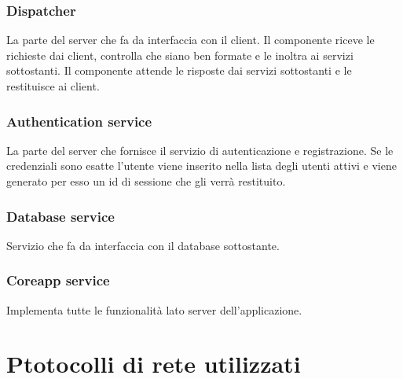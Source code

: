 \documentclass[12pt,a4]{article}
\begin{document}
\subsubsection{Dispatcher}
La parte del server che fa da interfaccia con il client. Il componente riceve le richieste dai client, controlla che siano ben formate e le inoltra ai servizi sottostanti. Il componente attende le risposte dai servizi sottostanti e le restituisce ai client.

\subsubsection{Authentication service}	
La parte del server che fornisce il servizio di autenticazione e registrazione. Se le credenziali sono esatte l'utente viene inserito nella lista degli utenti attivi e viene generato per esso un id di sessione che gli verrà restituito.  

\subsubsection{Database service}
Servizio che fa da interfaccia con il database sottostante.

\subsubsection{Coreapp service}
Implementa tutte le funzionalità lato server dell'applicazione.

\section{Ptotocolli di rete utilizzati}
\end{document}
